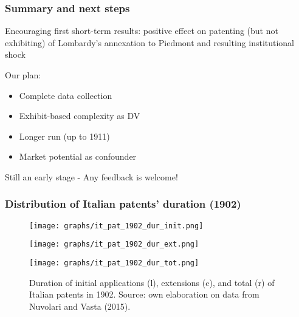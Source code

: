 \documentclass[10pt]{beamer}
\begin{document}
\begin{frame}
    \frametitle{Summary and next steps}

    Encouraging first short-term results: positive effect on patenting (but not exhibiting) of Lombardy's annexation to Piedmont and resulting institutional shock 

    \bigskip
    
    Our plan:
    \begin{itemize}
        \item Complete data collection
        \item Exhibit-based complexity as DV
        \item Longer run (up to 1911)
        \item Market potential as confounder
    \end{itemize}
  
    \bigskip
    
    Still an early stage - Any feedback is welcome!

\end{frame}

\appendix

\begin{frame}[label = duration]
    \frametitle{Distribution of Italian patents' duration (1902)}

\begin{figure}[h]
    \centering
    \begin{minipage}{0.32\textwidth}
        \centering
        \texttt{[image: graphs/it\_pat\_1902\_dur\_init.png]}
        \label{fig:figure1}
    \end{minipage}\hfill
    \begin{minipage}{0.32\textwidth}
        \centering
        \texttt{[image: graphs/it\_pat\_1902\_dur\_ext.png]}
        \label{fig:figure2}
    \end{minipage}\hfill
    \begin{minipage}{0.32\textwidth}
        \centering
        \texttt{[image: graphs/it\_pat\_1902\_dur\_tot.png]}
        \label{fig:figure3}
    \end{minipage}
    \caption{Duration of initial applications (l), extensions (c), and total (r) of Italian patents in 1902. Source: own elaboration on data from Nuvolari and Vasta (2015).}


\end{figure}

\hyperlink{patent_fees}{}
    
\end{frame}
\end{document}
